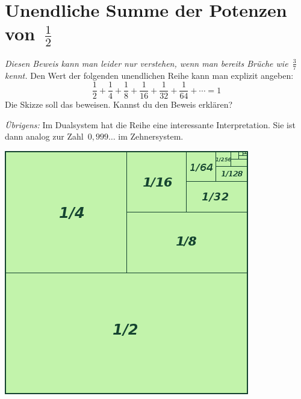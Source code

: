 \documentclass[a5paper,ngerman,landscape,11pt]{scrartcl}
\begin{document}
\vfill
\section*{Unendliche Summe der Potenzen von~$\frac{1}{2}$}
\emph{Diesen Beweis kann man leider nur verstehen, wenn man bereits Brüche
wie~$\frac{3}{7}$ kennt.}
Den Wert der folgenden unendlichen Reihe kann man
explizit angeben:
\[ \frac{1}{2} + \frac{1}{4} + \frac{1}{8} +
\frac{1}{16} + \frac{1}{32} + \frac{1}{64} + \cdots = 1 \]
Die Skizze soll das beweisen. Kannst du den Beweis erklären?

\emph{Übrigens:} Im Dualsystem hat die Reihe eine interessante Interpretation. Sie
ist dann analog zur Zahl~$0{,}999\ldots$ im Zehnersystem.

\vfill
\begin{center}
\includegraphics[scale=0.5]{geometrische-reihe-4}
\end{center}


\newpage
\end{document}
